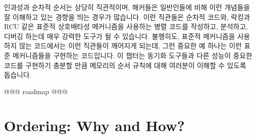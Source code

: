 
%

인과성과 순차적 순서는 상당히 직관적이며, 해커들은 일반인들에 비해 이런
개념들을 잘 이해하고 있는 경향을 띄는 경우가 많습니다.
이런 직관들은 순차적 코드와, 락킹과 RCU 같은 표준적 상호배타성 메커니즘을
사용하는 병렬 코드를 작성하고, 분석하고, 디버깅 하는데 매우 강력한 도구가 될 수
있습니다.
불행히도, 표준적 메커니즘을 사용하지 않는 코드에서는 이런 직관들이 깨어지게
되는데, 그런 중요한 예 하나는 이런 표준 메커니즘들을 구현하는 코드입니다.
이 챕터는 동기화 도구들과 다른 성능이 중요한 코드를 구현하기 충분할 만큼
메모리의 순서 규칙에 대해 여러분이 이해할 수 있도록 돕습니다.

@@@ roadmap @@@

\section{Ordering: Why and How?}
\label{sec:memorder:Ordering: Why and How?}

